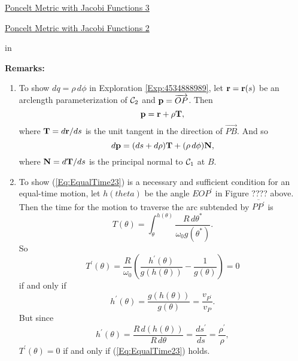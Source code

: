 \documentclass{ximera}
\newcommand{\pskip}{\vskip 0.1 in}
\begin{document}
\begin{exploration}
\begin{onlineOnly}
    \begin{center}
\end{center}
\end{onlineOnly}

\href{https://www.desmos.com/calculator/l7oadgwyva}{Poncelt Metric with Jacobi Functions 3} %
\end{exploration}


\begin{exploration}
\begin{onlineOnly}
    \begin{center}
\end{center}
\end{onlineOnly}

\href{https://www.desmos.com/calculator/hm5zop04ob}{Poncelt Metric with Jacobi Functions 2}
\end{exploration}

\pskip

{\bf Remarks:}
\begin{enumerate}
\item To show $dq = \rho \, d\phi$ in Exploration \ref{Exp:4534888989}, let ${\bf r} = {\bf r}(s)$ be an arclength parameterization of ${\cal C}_2$ and ${\bf p} = \overrightarrow{OP}$. Then 
\[
  {\bf p} = {\bf r} + \rho {\bf T} ,
\]
where ${\bf T} = d{\bf r}/ds$ is the unit tangent in the direction of $\overrightarrow{PB}$. And so
\[
  d  {\bf p} = (ds + d\rho){\bf T} + (\rho \, d\phi) {\bf N} , 
\]
where ${\bf N} = d{\bf T}/ds$ is the principal normal to ${\cal C}_1$ at $B$.

\item To show (\ref{Eq:EqualTime23}) is a necessary and sufficient condition for an equal-time motion, let $h(theta)$ be the angle $EOP^\prime$ in Figure ???? above. Then the time for the motion to traverse the arc subtended by $\overline{PP^\prime}$ is
\[
   T(\theta) =  \int_\theta^{h(\theta)} \frac{R\, d\theta^*}{\omega_0 g(\theta^*)}.
\]
So
\[
     T^\prime(\theta) =\frac{R}{\omega_0}\left(   \frac{h^\prime(\theta)}{g(h(\theta))} - \frac{1}{g(\theta)}        \right) = 0
\]
if and only if
\[
    h^\prime(\theta) = \frac{g(h(\theta))}{g(\theta)} = \frac{v_{P^\prime}}{v_P}.
\]
But since 
\[
    h^\prime(\theta) =  \frac{R\,  d(h(\theta))}{R\, d\theta} =  \frac{ds^\prime}{ds} =  \frac{\rho^\prime}{\rho} , %
\]
$T^\prime(\theta)=0$ if and only if (\ref{Eq:EqualTime23}) holds.
\end{enumerate} 
\end{document}

